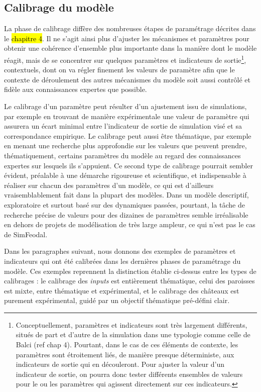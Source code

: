 \subsection{Calibrage du modèle \label{subsec:calibrage}}

La phase de calibrage diffère des nombreuses étapes de paramétrage décrites dans le \hl{chapitre 4}.
Il  ne s'agit ainsi plus d'ajuster les mécanismes et paramètres pour obtenir une cohérence d'ensemble plus importante dans la manière dont le modèle réagit, mais de se concentrer sur quelques paramètres et indicateurs de sortie\footnote{
Conceptuellement, paramètres et indicateurs sont très largement différents, situés de part et d'autre de la simulation dans une typologie comme celle de Balci (ref chap 4).
Pourtant, dans le cas de ces éléments de contexte, les paramètres sont étroitement liés, de manière presque déterministe, aux indicateurs de sortie qui en découleront.
Pour \og ajuster\fg{} la valeur d'un indicateur de sortie, on pourra donc tester différents ensembles de valeurs pour le ou les paramètres qui agissent directement sur ces indicateurs.
}, contextuels, dont on va régler finement les valeurs de paramètre afin que le contexte de déroulement des autres mécanismes du modèle soit aussi contrôlé et fidèle aux connaissances expertes que possible.

Le calibrage d'un paramètre peut résulter d'un ajustement issu de simulations, par exemple en trouvant de manière expérimentale une valeur de paramètre qui assurera un écart minimal entre l'indicateur de sortie de simulation visé et sa correspondance empirique.
Le calibrage peut aussi être thématique, par exemple en menant une recherche plus approfondie sur les valeurs que peuvent prendre, thématiquement, certains paramètres du modèle au regard des connaissances expertes sur lesquels ils s'appuient.
Ce second type de calibrage pourrait sembler évident, préalable à une démarche rigoureuse et scientifique, et indispensable à réaliser sur chacun des paramètres d'un modèle, ce qui est d'ailleurs vraisemblablement fait dans la plupart des modèles.
Dans un modèle descriptif, exploratoire et surtout basé sur des dynamiques passées, pourtant, la tâche de recherche précise de valeurs pour des dizaines de paramètres semble irréalisable en dehors de projets de modélisation de très large ampleur, ce qui n'est pas le cas de SimFeodal.

Dans les paragraphes suivant, nous donnons des exemples de paramètres et indicateurs qui ont été calibrées dans les dernières phases de paramétrage du modèle.
Ces exemples reprennent la distinction établie ci-dessus entre les types de calibrages : le calibrage des \textit{inputs} est entièrement thématique, celui des paroisses est mixte, entre thématique et expérimental, et le calibrage des châteaux est purement expérimental, guidé par un objectif thématique pré-défini clair.


